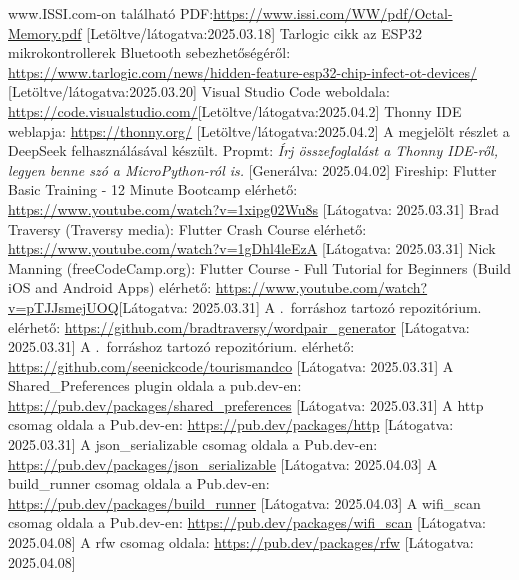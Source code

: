 \documentclass{thesis-ekf}
\theoremstyle{definition}
\theoremstyle{remark}
\begin{document}
\begin{thebibliography}{8}
	 www.ISSI.com-on található PDF:\url{https://www.issi.com/WW/pdf/Octal-Memory.pdf}
	 [Letöltve/látogatva:2025.03.18]
	 Tarlogic cikk az ESP32 mikrokontrollerek Bluetooth sebezhetőségéről: \url{https://www.tarlogic.com/news/hidden-feature-esp32-chip-infect-ot-devices/}
	[Letöltve/látogatva:2025.03.20]
	 Visual Studio Code weboldala: \url{https://code.visualstudio.com/}[Letöltve/látogatva:2025.04.2]
	 Thonny IDE weblapja: \url{https://thonny.org/}
	[Letöltve/látogatva:2025.04.2]
	 A megjelölt részlet a DeepSeek felhasználásával készült. Propmt: \textit{Írj összefoglalást a Thonny IDE-ről, legyen benne szó a MicroPython-ról is.}
	[Generálva: 2025.04.02]
	 Fireship: Flutter Basic Training - 12 Minute Bootcamp elérhető: \url{https://www.youtube.com/watch?v=1xipg02Wu8s}
	[Látogatva: 2025.03.31]
	 Brad Traversy (Traversy media): Flutter Crash Course elérhető: \url{https://www.youtube.com/watch?v=1gDhl4leEzA}
	[Látogatva: 2025.03.31]
	 Nick Manning (freeCodeCamp.org): Flutter Course - Full Tutorial for Beginners (Build iOS and Android Apps) elérhető: \url{https://www.youtube.com/watch?v=pTJJsmejUOQ}[Látogatva: 2025.03.31]
	 A \cite{bib_flutter_traversy}.~forráshoz tartozó repozitórium. elérhető: \url{https://github.com/bradtraversy/wordpair_generator}
	[Látogatva: 2025.03.31]
	 A \cite{bib_flutter_freecodecamp}.~forráshoz tartozó repozitórium. elérhető: \url{https://github.com/seenickcode/tourismandco}
	[Látogatva: 2025.03.31]
	 A Shared\_Preferences plugin oldala a pub.dev-en: \url{https://pub.dev/packages/shared_preferences}
	[Látogatva: 2025.03.31]
	 A http csomag oldala a Pub.dev-en: \url{https://pub.dev/packages/http}
	[Látogatva: 2025.03.31]
	 A json\_serializable csomag oldala a Pub.dev-en: \url{https://pub.dev/packages/json_serializable}
	[Látogatva: 2025.04.03]
	 A build\_runner csomag oldala a Pub.dev-en: \url{https://pub.dev/packages/build_runner}
	[Látogatva: 2025.04.03]
	 A wifi\_scan csomag oldala a Pub.dev-en: \url{https://pub.dev/packages/wifi_scan}
	[Látogatva: 2025.04.08]
	 A rfw csomag oldala: \url{https://pub.dev/packages/rfw}
	[Látogatva: 2025.04.08]
\end{thebibliography}
\end{document}
